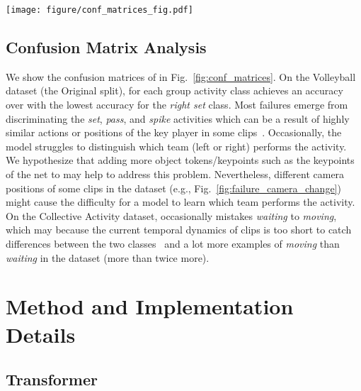 \documentclass[runningheads]{llncs}
\begin{document}
\begin{figure*}[t]
	\centering
	\texttt{[image: figure/conf\_matrices\_fig.pdf]} 
	\caption{Confusion matrices  of \ours on (a) the Volleyball dataset (the Original split) and (b) the Collective Activity dataset.
}
	\label{fig:conf_matrices} 
\end{figure*}
  


\subsection{Confusion Matrix Analysis}
\label{appendix_subsec:conf_matrix}
We show the confusion matrices of \ours in Fig.~\ref{fig:conf_matrices}.
On the Volleyball dataset (the Original split), for each group activity class
\ours achieves an accuracy over  with the lowest accuracy for the \textit{right set} class. 
Most failures emerge from discriminating the \textit{set}, \textit{pass}, and \textit{spike} activities which can
be a result of 
highly similar actions or positions of the key player in some clips~\cite{actor-transformer,prl,higcin}. 
Occasionally, the model struggles to distinguish which team (left or right) performs the 
activity. 
We hypothesize that adding more object tokens/keypoints such as the keypoints of the net to \ours may help to address this problem.
Nevertheless, different camera positions of some clips in the dataset (e.g., Fig.~\ref{fig:failure_camera_change}) might cause the difficulty for a model to learn which team performs the activity. 
On the Collective Activity dataset, \ours occasionally mistakes \textit{waiting} to \textit{moving}, which may because the current temporal dynamics of  clips is too short to catch differences between the two classes~\cite{yuan2021learning} and a lot more examples of \textit{moving} than \textit{waiting} in the dataset (more than twice more). 





 

  


 
\renewcommand{\thesection}{F}
\section{Method and Implementation Details}
\label{appendix_sec:imple_details} 


\subsection{Transformer} 
\label{appendix_subsec:transformer_review} 
\end{document}
